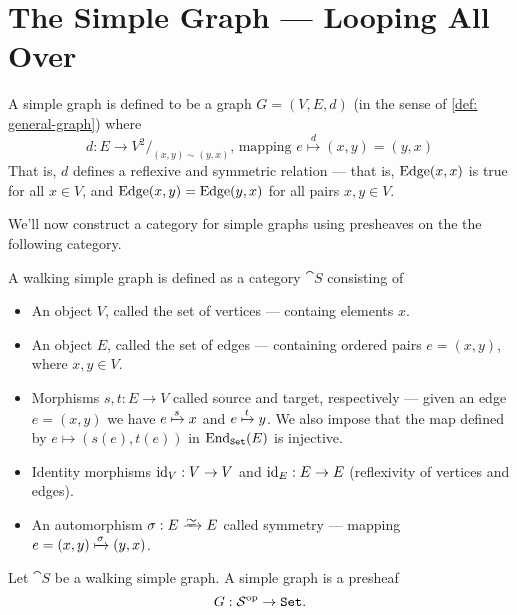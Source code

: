 \section{The Simple Graph --- Looping All Over}

\begin{definition}\label{def: simp-graph}
  A simple graph is defined to be a graph \(G = (V, E, d)\) (in the sense of
  \cref{def: general-graph}) where
  \[
    d: E \to V^2/_{(x, y) \sim (y, x)}
    \text{, mapping }
    e \overset d \longmapsto (x, y) = (y, x)
  \]
  That is, \(d\) defines a reflexive and symmetric relation --- that is,
  \(\operatorname{Edge}(x, x)\) is true for all \(x \in V\), and \(\operatorname{Edge}(x, y) = \operatorname{Edge}(y, x)\)
  for all pairs \(x, y \in V\).
\end{definition}

We'll now construct a category for simple graphs using presheaves on the the
following category.

\begin{definition}\label{def: walking-simp-graph}
  A walking simple graph is defined as a category \(\cat S\) consisting of
  \begin{itemize}
    \setlength\itemsep{0.0em}
    \item An object \(V\), called the set of vertices --- containg elements
      \(x\).
    \item An object \(E\), called the set of edges --- containing ordered pairs
      \(e = (x, y)\), where \(x, y \in V\).
    \item Morphisms \(s, t: E \to V\) called source and target, respectively ---
      given an edge \(e = (x, y)\) we have \(e \xmapsto{s} x\) and \(e \xmapsto{t}
      y\). We also impose that the map defined by \(e \mapsto (s(e), t(e))\)
      in \(\operatorname{End}_{{\texttt{Set}}}(E)\) is injective.
    \item Identity morphisms \(\operatorname{id}_V: V \to V\) and \(\operatorname{id}_E: E \to E\)
      (reflexivity of vertices and edges).
    \item An automorphism \(\sigma: E \isoto E\) called symmetry --- mapping \(e =
      (x, y) \xmapsto\sigma (y, x)\).
  \end{itemize}
\end{definition}

\begin{proposition}\label{prop: simp-graph-presheaf}
  Let \(\cat S\) be a walking simple graph. A simple graph is a presheaf
  \[
    G: \mathcal S^{\mathrm{op}} \to {\texttt{Set}}.
  \]
\end{proposition}


